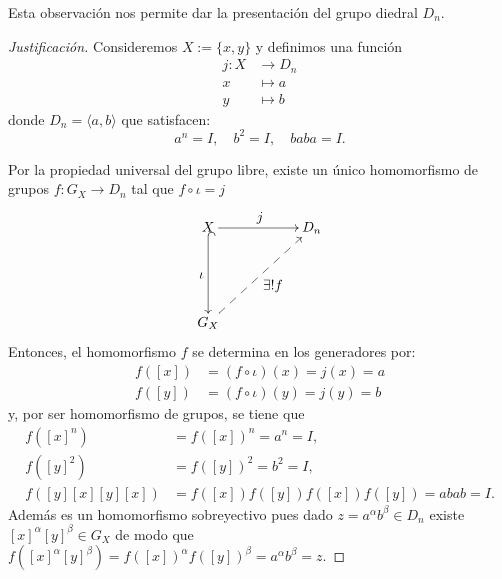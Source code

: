 \begin{observacion}
\end{observacion}
Esta observación nos permite dar la presentación del grupo diedral $D_n$.  
\begin{proposicion}
\end{proposicion}

\begin{proof}[Justificación]
	Consideremos \( X := \{x, y\} \) y definimos una función
	\begin{align*}
		j : X &\longrightarrow D_n \\[4pt]
		x &\longmapsto a \\[2pt]
		y &\longmapsto b
	\end{align*}
	donde \( D_n = \langle a, b \rangle \) que satisfacen:
	\[
	a^n = I,\quad b^2 = I,\quad baba= I.
	\]
	
	\medskip
	
	\noindent Por la propiedad universal del grupo libre, existe un único homomorfismo de grupos
	$f : G_X \longrightarrow D_n$ tal que $f \circ \iota = j$
	\[
	\xymatrix{
		X \ar[rr]^{\displaystyle j} \ar@{^(->}[dd]_{\displaystyle \iota } & & D_n \\ 
		&&\\
		G_X \ar@{-->}[rruu]_{\displaystyle \exists !f} &&
	}
	\] Entonces, el homomorfismo \( f \) se determina en los generadores por:
	\begin{align*}
		f([x]) &= (f\circ\iota)(x)=j(x)=a \\[4pt]
		f([y]) &= (f\circ \iota)(y)=j(y)=b
	\end{align*}
	y, por ser homomorfismo de grupos, se tiene que
	\begin{align*}
		f([x]^n) &= f([x])^n = a^n = I, \\[4pt]
		f([y]^2) &= f([y])^2 = b^2 = I, \\[4pt]
		f([y][x][y][x]) &=f([x])f([y])f([x])f([y]) = abab = I.
	\end{align*}
	Además es un homomorfismo sobreyectivo pues dado $z=a^\alpha b^\beta\in D_n$ existe $[x]^\alpha[y]^\beta\in G_X$ de modo que $f\left([x]^\alpha[y]^\beta\right)=f([x])^\alpha f([y])^\beta=a^\alpha b^\beta=z$.
	

\end{proof}
